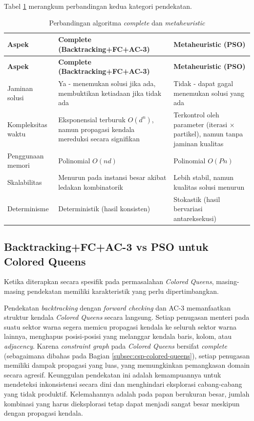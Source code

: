 Tabel \ref{tab:complete-vs-meta} merangkum perbandingan kedua kategori pendekatan.

\begin{longtable}{lp{5.5cm}p{5.5cm}}
	\caption{Perbandingan algoritma \textit{complete} dan \textit{metaheuristic}}
	\label{tab:complete-vs-meta} \\
	\toprule
	\textbf{Aspek} & \textbf{Complete (Backtracking+FC+AC-3)} & \textbf{Metaheuristic (PSO)} \\
	\midrule
	\endfirsthead
	\toprule
	\textbf{Aspek} & \textbf{Complete (Backtracking+FC+AC-3)} & \textbf{Metaheuristic (PSO)} \\
	\midrule
	\endhead
	\bottomrule
	\endfoot
	Jaminan solusi & Ya - menemukan solusi jika ada, membuktikan ketiadaan jika tidak ada & Tidak - dapat gagal menemukan solusi yang ada \\
	\midrule
	Kompleksitas waktu & Eksponensial terburuk $O(d^n)$, namun propagasi kendala mereduksi secara signifikan & Terkontrol oleh parameter (iterasi $\times$ partikel), namun tanpa jaminan kualitas \\
	\midrule
	Penggunaan memori & Polinomial $O(nd)$ & Polinomial $O(Pn)$ \\
	\midrule
	Skalabilitas & Menurun pada instansi besar akibat ledakan kombinatorik & Lebih stabil, namun kualitas solusi menurun \\
	\midrule
	Determinisme & Deterministik (hasil konsisten) & Stokastik (hasil bervariasi antareksekusi) \\
	\bottomrule
\end{longtable}

\subsection{Backtracking+FC+AC-3 vs PSO untuk Colored Queens}
\label{subsec:perbandingan-bt-pso}

Ketika diterapkan secara spesifik pada permasalahan \textit{Colored Queens}, masing-masing pendekatan memiliki karakteristik yang perlu dipertimbangkan.

Pendekatan \textit{backtracking} dengan \textit{forward checking} dan AC-3 memanfaatkan struktur kendala \textit{Colored Queens} secara langsung. Setiap penugasan menteri pada suatu sektor warna segera memicu propagasi kendala ke seluruh sektor warna lainnya, menghapus posisi-posisi yang melanggar kendala baris, kolom, atau \textit{adjacency}. Karena \textit{constraint graph} pada \textit{Colored Queens} bersifat \textit{complete} (sebagaimana dibahas pada Bagian \ref{subsec:csp-colored-queens}), setiap penugasan memiliki dampak propagasi yang luas, yang memungkinkan pemangkasan domain secara agresif. Keunggulan pendekatan ini adalah kemampuannya untuk mendeteksi inkonsistensi secara dini dan menghindari eksplorasi cabang-cabang yang tidak produktif. Kelemahannya adalah pada papan berukuran besar, jumlah kombinasi yang harus dieksplorasi tetap dapat menjadi sangat besar meskipun dengan propagasi kendala.

